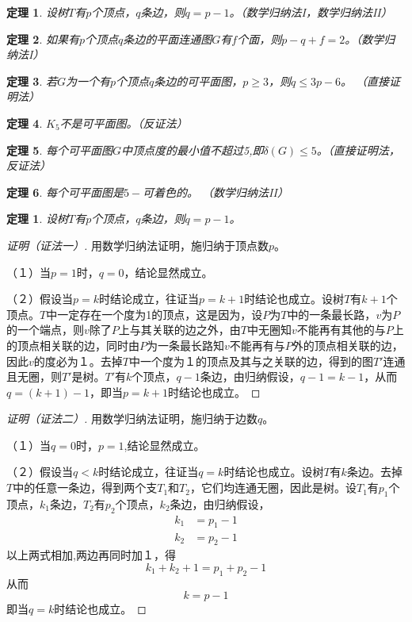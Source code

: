 \documentclass{article}
\begin{document}
\begin{CJK}{UTF8}{gbsn}
  \newtheorem{Th1}{定理}
  \newtheorem{Th2}{定理}
  \begin{Th1}
  设树$T$有$p$个顶点，$q$条边，则$q = p-1$。（数学归纳法I，数学归纳法II）
  \end{Th1}
  \begin{Th1}
  如果有$p$个顶点$q$条边的平面连通图$G$有$f$个面，则$p - q + f = 2$。（数学归纳法I）
\end{Th1}
\begin{Th1}
  若$G$为一个有$p$个顶点$q$条边的可平面图，$p\geq 3$，则$q \leq 3p - 6$。
  （直接证明法）
\end{Th1}
\begin{Th1}
      $K_5$不是可平面图。（反证法）
\end{Th1}
\begin{Th1}
每个可平面图$G$中顶点度的最小值不超过5,即$\delta (G) \leq 5$。（直接证明法，反证法）   
\end{Th1}
\begin{Th1}
  每个可平面图是$5-$可着色的。    （数学归纳法II）
\end{Th1}
\begin{Th2}
  设树$T$有$p$个顶点，$q$条边，则$q = p-1$。
\end{Th2}
\begin{proof}[证明（证法一）]
  \mbox{}\par{}
    用数学归纳法证明，施归纳于顶点数$p$。
    
    （１）当$p=1$时，$q=0$，结论显然成立。

    （２）假设当$p=k$时结论成立，往证当$p=k+1$时结论也成立。设树$T$有$k+1$个顶点。$T$中一定存在一个度为1的顶点，这是因为，设$P$为$T$中的一条最长路，$v$为$P$的一个端点，则$v$除了$P$上与其关联的边之外，由$T$中无圈知$v$不能再有其他的与$P$上的顶点相关联的边，同时由$P$为一条最长路知$v$不能再有与$P$外的顶点相关联的边，因此$v$的度必为１。去掉$T$中一个度为１的顶点及其与之关联的边，得到的图$T'$连通且无圈，则$T'$是树。$T'$有$k$个顶点，$q-1$条边，由归纳假设，$q-1 = k - 1$，从而$q = (k +1) - 1$，即当$p=k+1$时结论也成立。
\end{proof}
\begin{proof}[证明（证法二）]
\mbox{}\par{}
      用数学归纳法证明，施归纳于边数$q$。
    
    （１）当$q=0$时，$p=1$,结论显然成立。

    （２）假设当$q<k$时结论成立，往证当$q=k$时结论也成立。设树$T$有$k$条边。去掉$T$中的任意一条边，得到两个支$T_1$和$T_2$，它们均连通无圈，因此是树。设$T_1$有$p_1$个顶点，$k_1$条边，$T_2$有$p_2$个顶点，$k_2$条边，由归纳假设，
    \begin{equation*}
      \begin{split}
        k_1 &= p_1 - 1\\
        k_2 &= p_2 - 1
      \end{split}
    \end{equation*}
    以上两式相加,两边再同时加１，得
    \[k_1 + k_2  + 1 = p_1 + p_2 - 1\]
    从而
    \[k = p - 1 \]
    即当$q=k$时结论也成立。
\end{proof}


\end{CJK}
\end{document}
